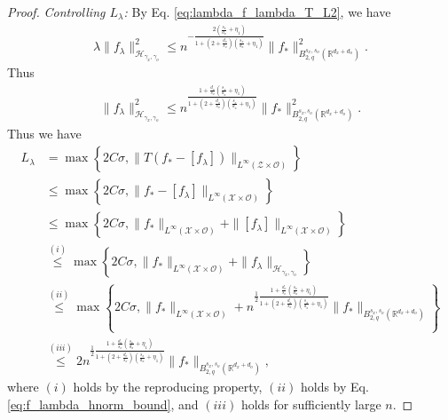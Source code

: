 \documentclass[11pt]{article}
\newcommand{\calZ}{\mathcal{Z}}
\newcommand{\calH}{\mathcal{H}}
\newcommand{\calO}{\mathcal{O}}
\newcommand{\calX}{\mathcal{X}}
\newcommand{\R}{\mathbb{R}}
\newcommand{\0}{\mathbf{0}}
\begin{document}
\begin{appendix}
\begin{proof}
\textit{Controlling $L_{\lambda}$:  } 
By Eq. \eqref{eq:lambda_f_lambda_T_L2}, we have
\begin{align*}
    \lambda \|f_{\lambda}\|^2_{\calH_{\gamma_x,\gamma_o}} \leq n^{-\frac{2(\frac{s_x}{d_x}+\eta_1)}{1+(2+\frac{d_o}{s_o})(\frac{s_x}{d_x}+\eta_1)}} \|f_\ast\|_{B^{s_x,s_o}_{2,q}(\R^{d_x+d_o})}^2 .
\end{align*}
Thus 
\begin{align}
\label{eq:f_lambda_hnorm_bound}
    \|f_{\lambda}\|^2_{\calH_{\gamma_x,\gamma_o}} \leq n^{\frac{1+\frac{d_o}{s_o}(\frac{s_x}{d_x}+\eta_1)}{1+(2+\frac{d_o}{s_o})(\frac{s_x}{d_x}+\eta_1)}} \|f_\ast\|_{B^{s_x,s_o}_{2,q} (\R^{d_x+d_o})}^2 .
\end{align}
Thus we have
\begin{align}
    L_{\lambda} &= \max\left\{2C\sigma, \|T(f_{\ast} - [f_{\lambda}])\|_{L^{\infty}(\calZ\times \calO)}\right\}\nonumber\\
    &\leq \max\left\{2C\sigma, \|f_{\ast} - [f_{\lambda}]\|_{L^{\infty}(\calX\times \calO)}\right\}\nonumber\\
    &\leq  \max\left\{2C\sigma, \|f_{\ast}\|_{L^{\infty}(\calX\times \calO)} + \|[f_{\lambda}]\|_{L^{\infty}(\calX\times \calO)}\right\}\nonumber\\
    &\stackrel{(i)}{\leq} \max\left\{2C\sigma, \|f_{\ast}\|_{L^{\infty}(\calX\times \calO)} + \|f_{\lambda}\|_{\calH_{\gamma_x,\gamma_o}}\right\}\nonumber\\
    &\stackrel{(ii)}{\leq} \max\left\{2C\sigma, \|f_{\ast}\|_{L^{\infty}(\calX\times \calO)} + n^{\frac{1}{2}\frac{1+\frac{d_o}{s_o}(\frac{s_x}{d_x}+\eta_1)}{1+(2+\frac{d_o}{s_o})(\frac{s_x}{d_x}+\eta_1)}} \|f_\ast\|_{B^{s_x,s_o}_{2,q} (\R^{d_x+d_o})} \right\}\nonumber\\
    &\stackrel{(iii)}{\leq} 2 n^{\frac{1}{2}\frac{1+\frac{d_o}{s_o}(\frac{s_x}{d_x}+\eta_1)}{1+(2+\frac{d_o}{s_o})(\frac{s_x}{d_x}+\eta_1)}} \|f_\ast\|_{B^{s_x,s_o}_{2,q} (\R^{d_x+d_o})} \label{eq:l_lambda_bound},
\end{align}
where $(i)$ holds by the reproducing property, $(ii)$ holds by Eq. \eqref{eq:f_lambda_hnorm_bound}, and $(iii)$ holds for sufficiently large $n$.


\end{proof}
\end{appendix}
\end{document}
